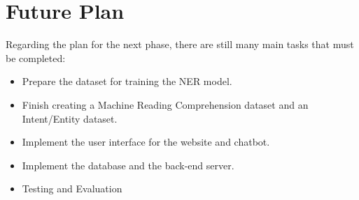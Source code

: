 \section{Future Plan}
Regarding the plan for the next phase, there are still many main tasks that must be completed:

\begin{itemize}
    \item Prepare the dataset for training the NER model.
    \item Finish creating a Machine Reading Comprehension dataset and an Intent/Entity dataset.
    \item Implement the user interface for the website and chatbot.
    \item Implement the database and the back-end server.
    \item Testing and Evaluation
\end{itemize}
